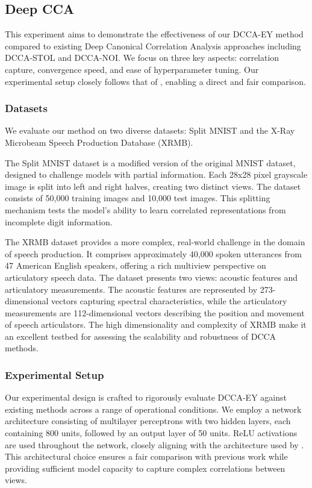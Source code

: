 \subsection{Deep CCA}\label{sec:experiments-DCCA}
This experiment aims to demonstrate the effectiveness of our DCCA-EY method compared to existing Deep Canonical Correlation Analysis approaches including DCCA-STOL and DCCA-NOI. We focus on three key aspects: correlation capture, convergence speed, and ease of hyperparameter tuning. Our experimental setup closely follows that of \citet{wang2015stochastic}, enabling a direct and fair comparison.

\subsubsection{Datasets}
We evaluate our method on two diverse datasets: Split MNIST and the X-Ray Microbeam Speech Production Database (XRMB).

The Split MNIST dataset is a modified version of the original MNIST dataset, designed to challenge models with partial information. Each 28x28 pixel grayscale image is split into left and right halves, creating two distinct views. The dataset consists of 50,000 training images and 10,000 test images. This splitting mechanism tests the model's ability to learn correlated representations from incomplete digit information.

The XRMB dataset provides a more complex, real-world challenge in the domain of speech production. It comprises approximately 40,000 spoken utterances from 47 American English speakers, offering a rich multiview perspective on articulatory speech data. The dataset presents two views: acoustic features and articulatory measurements. The acoustic features are represented by 273-dimensional vectors capturing spectral characteristics, while the articulatory measurements are 112-dimensional vectors describing the position and movement of speech articulators. The high dimensionality and complexity of XRMB make it an excellent testbed for assessing the scalability and robustness of DCCA methods.

\subsubsection{Experimental Setup}

Our experimental design is crafted to rigorously evaluate DCCA-EY against existing methods across a range of operational conditions. We employ a network architecture consisting of multilayer perceptrons with two hidden layers, each containing 800 units, followed by an output layer of 50 units. ReLU activations are used throughout the network, closely aligning with the architecture used by \citet{wang2015stochastic}. This architectural choice ensures a fair comparison with previous work while providing sufficient model capacity to capture complex correlations between views.

